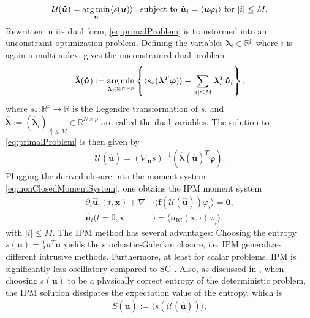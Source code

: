 \begin{align}\label{eq:primalProblem}
\mathcal{U}(\bm{\hat u}) = \operatorname*{arg\,min}_{\bm u} \langle s(\bm u) \rangle \enskip \text{ subject to } \bm{\hat u}_i = \langle \bm u \varphi_i \rangle \text{ for } |i| \leq M.
\end{align}
Rewritten in its dual form, \eqref{eq:primalProblem} is transformed into an unconstraint optimization problem. Defining the variables $\bm{\lambda}_i\in\mathbb{R}^p$ where $i$ is again a multi index, gives the unconstrained dual problem
\begin{align}\label{eq:dualProblem}
 \bm{\hat \lambda}(\bm{\hat u}) := \operatorname*{arg\,min}_{\bm{\lambda} \in \mathbb{R}^{N \times p}}
  \left\{\langle s_*(\bm{\lambda}^T \bm\varphi)\rangle - \sum_{|i|\leq M}\bm{\lambda}_i^T \bm{\hat u}_i\right\},
\end{align}
where $s_*:\mathbb{R}^p\to\mathbb{R}$ is the Legendre transformation of $s$, and $\bm{ \hat\lambda}:=(\bm{\hat{\lambda}}_i)_{|i|\leq M}\in \mathbb{R}^{N \times p}$ are called the dual variables. The solution to \eqref{eq:primalProblem} is then given by
\begin{align}\label{eq:ansatz}
 \mathcal{U}(\bm{\hat u}) = \left( \nabla_{\bm{u}} s \right)^{-1}(\bm{\hat{\lambda}}(\bm{\hat u})^T \bm{\varphi}).
\end{align}
Plugging the derived closure into the moment system \eqref{eq:nonClosedMomentSystem}, one obtains the IPM moment system
\begin{subequations}\label{eq:IPMmomentSystem}
\begin{align}
\partial_t \bm{\hat u}_i(t,\bm{x}) + \nabla&\cdot\langle\bm{f}(\mathcal{U}(\bm{\hat u})) \varphi_i\rangle = \bm{0}, \\
\bm{\hat u}_i(t=0,\bm{x}&) = \langle\bm{u}_{\text{IC}}(\bm{x},\cdot)\varphi_i\rangle.
\end{align}
\end{subequations}
with $|i|\leq M$. The IPM method has several advantages: Choosing the entropy $s(\bm{u}) = \frac{1}{2}\bm{u}^T\bm{u}$ yields the stochastic-Galerkin closure, i.e. IPM generalizes different intrusive methods. Furthermore, at least for scalar problems, IPM is significantly less oscillatory compared to SG \cite{kusch2017maximum}. Also, as discussed in \cite{poette2009uncertainty}, when choosing $s(\bm u)$ to be a physically correct entropy of the deterministic problem, the IPM solution dissipates the expectation value of the entropy, which is
\begin{align*}
S(\bm{\hat u}) := \langle s( \mathcal{U}(\bm{\hat u}))\rangle,
\end{align*}
